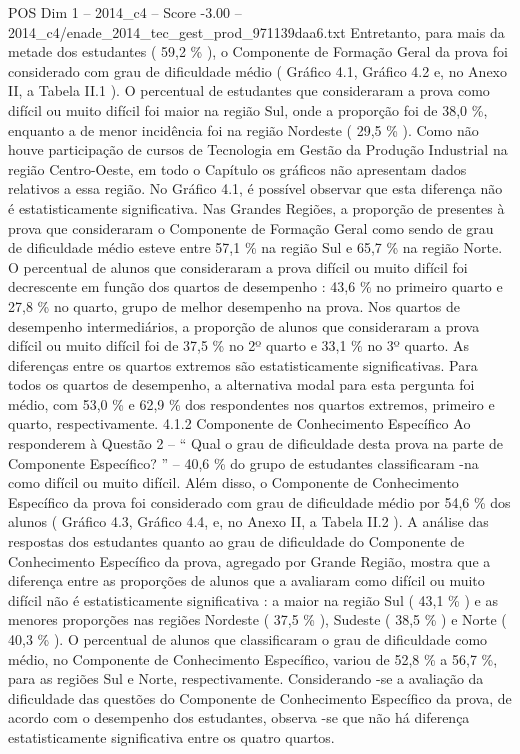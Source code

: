 \begin{textsample}{POS Dim 1 – 2014\_c4 – Score -3.00 – 2014\_c4/enade\_2014\_tec\_gest\_prod\_971139daa6.txt}
Entretanto, para mais da metade dos estudantes ( 59,2 \% ), o Componente de Formação Geral da prova foi considerado com grau de dificuldade médio ( Gráfico 4.1, Gráfico 4.2 e, no Anexo II, a Tabela II.1 ).
O percentual de estudantes que consideraram a prova como difícil ou muito difícil foi maior na região Sul, onde a proporção foi de 38,0 \%, enquanto a de menor incidência foi na região Nordeste ( 29,5 \% ).
Como não houve participação de cursos de Tecnologia em Gestão da Produção Industrial na região Centro-Oeste, em todo o Capítulo os gráficos não apresentam dados relativos a essa região.
No Gráfico 4.1, é possível observar que esta diferença não é estatisticamente significativa.
Nas Grandes Regiões, a proporção de presentes à prova que consideraram o Componente de Formação Geral como sendo de grau de dificuldade médio esteve entre 57,1 \% na região Sul e 65,7 \% na região Norte.
O percentual de alunos que consideraram a prova difícil ou muito difícil foi decrescente em função dos quartos de desempenho : 43,6 \% no primeiro quarto e 27,8 \% no quarto, grupo de melhor desempenho na prova.
Nos quartos de desempenho intermediários, a proporção de alunos que consideraram a prova difícil ou muito difícil foi de 37,5 \% no 2º quarto e 33,1 \% no 3º quarto.
As diferenças entre os quartos extremos são estatisticamente significativas.
Para todos os quartos de desempenho, a alternativa modal para esta pergunta foi médio, com 53,0 \% e 62,9 \% dos respondentes nos quartos extremos, primeiro e quarto, respectivamente. 4.1.2 Componente de Conhecimento Específico Ao responderem à Questão 2 – “ Qual o grau de dificuldade desta prova na parte de Componente Específico? ” – 40,6 \% do grupo de estudantes classificaram -na como difícil ou muito difícil.
Além disso, o Componente de Conhecimento Específico da prova foi considerado com grau de dificuldade médio por 54,6 \% dos alunos ( Gráfico 4.3, Gráfico 4.4, e, no Anexo II, a Tabela II.2 ).
A análise das respostas dos estudantes quanto ao grau de dificuldade do Componente de Conhecimento Específico da prova, agregado por Grande Região, mostra que a diferença entre as proporções de alunos que a avaliaram como difícil ou muito difícil não é estatisticamente significativa : a maior na região Sul ( 43,1 \% ) e as menores proporções nas regiões Nordeste ( 37,5 \% ), Sudeste ( 38,5 \% ) e Norte ( 40,3 \% ).
O percentual de alunos que classificaram o grau de dificuldade como médio, no Componente de Conhecimento Específico, variou de 52,8 \% a 56,7 \%, para as regiões Sul e Norte, respectivamente.
Considerando -se a avaliação da dificuldade das questões do Componente de Conhecimento Específico da prova, de acordo com o desempenho dos estudantes, observa -se que não há diferença estatisticamente significativa entre os quatro quartos.

\end{textsample}
